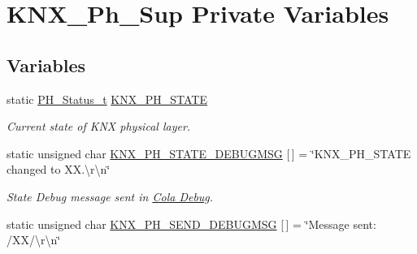 \hypertarget{group___k_n_x___p_h___sup___private___variables}{}\section{K\+N\+X\+\_\+\+Ph\+\_\+\+Sup Private Variables}
\label{group___k_n_x___p_h___sup___private___variables}
\subsection*{Variables}
\begin{DoxyCompactItemize}
\item 
static \hyperlink{group___k_n_x___p_h___sup___exported___types_ga5b665a94bef912fbfbea7cc949ed0e49}{P\+H\+\_\+\+Status\+\_\+t} \hyperlink{group___k_n_x___p_h___sup___private___variables_gaed45956ede9586539568adc9994c6dfb}{K\+N\+X\+\_\+\+P\+H\+\_\+\+S\+T\+A\+TE}\hypertarget{group___k_n_x___p_h___sup___private___variables_gaed45956ede9586539568adc9994c6dfb}{}\label{group___k_n_x___p_h___sup___private___variables_gaed45956ede9586539568adc9994c6dfb}

\begin{DoxyCompactList}\small\item\em Current state of K\+NX physical layer. \end{DoxyCompactList}\item 
static unsigned char \hyperlink{group___k_n_x___p_h___sup___private___variables_gaa18f29dc3cf5b41ce81bcf264601d400}{K\+N\+X\+\_\+\+P\+H\+\_\+\+S\+T\+A\+T\+E\+\_\+\+D\+E\+B\+U\+G\+M\+SG} \mbox{[}$\,$\mbox{]} = \char`\"{}K\+N\+X\+\_\+\+P\+H\+\_\+\+S\+T\+A\+TE changed to X\+X.\textbackslash{}r\textbackslash{}n\char`\"{}\hypertarget{group___k_n_x___p_h___sup___private___variables_gaa18f29dc3cf5b41ce81bcf264601d400}{}\label{group___k_n_x___p_h___sup___private___variables_gaa18f29dc3cf5b41ce81bcf264601d400}

\begin{DoxyCompactList}\small\item\em State Debug message sent in \hyperlink{group___cola___debug}{Cola Debug}. \end{DoxyCompactList}\item 
static unsigned char \hyperlink{group___k_n_x___p_h___sup___private___variables_ga16f43b8d36bcc39b90564fac102ac721}{K\+N\+X\+\_\+\+P\+H\+\_\+\+S\+E\+N\+D\+\_\+\+D\+E\+B\+U\+G\+M\+SG} \mbox{[}$\,$\mbox{]} = \char`\"{}Message sent\+: /XX/\textbackslash{}r\textbackslash{}n\char`\"{}\hypertarget{group___k_n_x___p_h___sup___private___variables_ga16f43b8d36bcc39b90564fac102ac721}{}\label{group___k_n_x___p_h___sup___private___variables_ga16f43b8d36bcc39b90564fac102ac721}


\end{DoxyCompactItemize}

